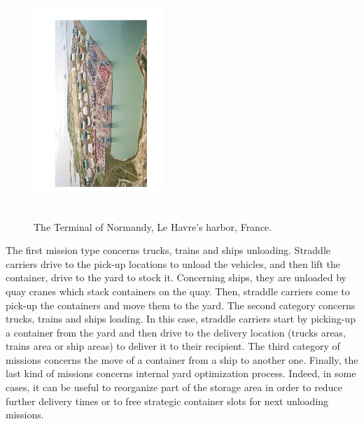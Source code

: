 \documentclass[review]{elsarticle}
\begin{document}
\begin{figure}[ht]
  \begin{center}
  \includegraphics[height=8.995cm,width=4.938cm,angle=-90]{terminalOfNormandy.pdf}
  \caption{The Terminal of Normandy, Le Havre's harbor, France.}
\end{center}
\end{figure}


The first mission type concerns trucks, trains and ships unloading. Straddle carriers drive to the pick-up locations to unload the vehicles, and then lift the container, drive to the yard to stock it. Concerning ships, they are unloaded by quay cranes which stack containers on the quay. Then, straddle carriers come to pick-up the containers and move them to the yard.
The second category concerns trucks, trains and ships loading. In this case, straddle carriers start by picking-up a container from the yard and then drive to the delivery location (trucks areas, trains area or ship areas) to deliver it to their recipient. 
The third category of missions concerns the move of a container from a ship to another one.
Finally, the last kind of missions concerns internal yard optimization process. Indeed, in some cases, it can be useful to reorganize part of the storage area in order to reduce further delivery times or to free strategic container slots for next unloading missions.\\
\end{document}
